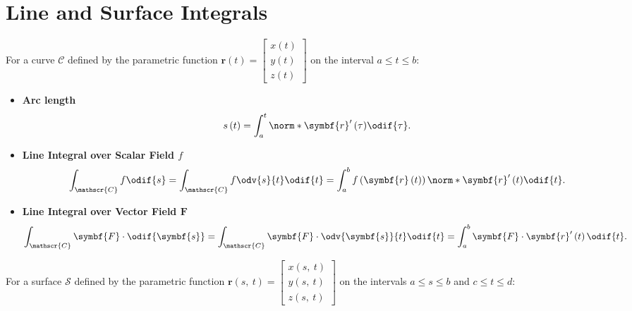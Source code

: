 \documentclass{article}
\begin{document}
\section{Line and Surface Integrals}
For a curve \(\mathscr{C}\) defined by the parametric function
\(\symbf{r}\left( t \right) = \begin{bmatrix}
    x\left( t \right) \\
    y\left( t \right) \\
    z\left( t \right)
\end{bmatrix}\)
on the interval \(a \leqslant t \leqslant b\):
\begin{itemize}
    \item \textbf{Arc length}
          \begin{equation*}
              s\left( t \right) = \int_a^t \norm*{\symbf{r}'\left( \tau \right)} \odif{\tau}.
          \end{equation*}
    \item \textbf{Line Integral over Scalar Field \(f\)}
          \begin{equation*}
              \int_{\mathscr{C}} f \odif{s} = \int_{\mathscr{C}} f \odv{s}{t} \odif{t} = \int_a^b f\left( \symbf{r}\left( t \right) \right) \norm*{\symbf{r}'\left( t \right)} \odif{t}.
          \end{equation*}
    \item \textbf{Line Integral over Vector Field \(\symbf{F}\)}
          \begin{equation*}
              \int_{\mathscr{C}} \symbf{F} \cdot \odif{\symbf{s}} = \int_{\mathscr{C}} \symbf{F} \cdot \odv{\symbf{s}}{t} \odif{t} = \int_a^b \symbf{F} \cdot \symbf{r}'\left( t \right) \odif{t}.
          \end{equation*}
\end{itemize}
For a surface \(\mathscr{S}\) defined by the parametric function
\(\symbf{r}\left( s,\: t  \right) = \begin{bmatrix}
    x\left( s,\: t \right) \\
    y\left( s,\: t \right) \\
    z\left( s,\: t \right)
\end{bmatrix}\)
on the intervals \(a \leqslant s \leqslant b\) and \(c \leqslant t \leqslant d\):
\end{document}
